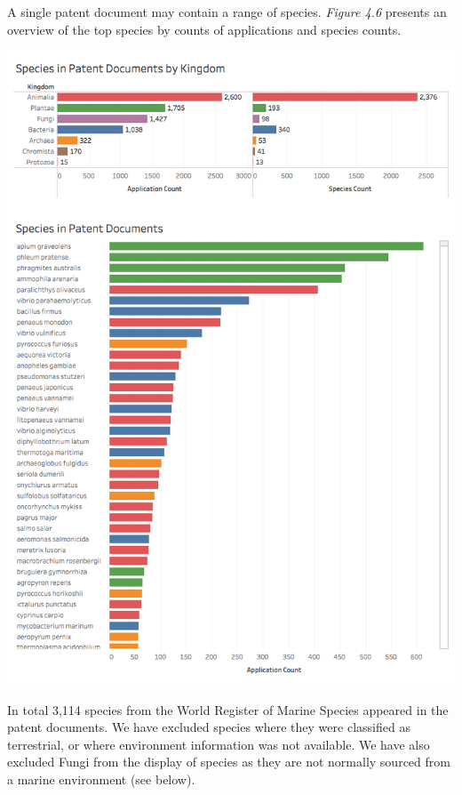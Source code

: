 \documentclass[]{book}
\theoremstyle{definition}
\theoremstyle{definition}
\theoremstyle{definition}
\theoremstyle{remark}
\begin{document}
A single patent document may contain a range of species. \emph{Figure
4.6} presents an overview of the top species by counts of applications
and species counts.

\includegraphics[width=11.49in]{images-patents/patent_species_dashboard}

In total 3,114 species from the World Register of Marine Species
appeared in the patent documents. We have excluded species where they
were classified as terrestrial, or where environment information was not
available. We have also excluded Fungi from the display of species as
they are not normally sourced from a marine environment (see below).
\end{document}

